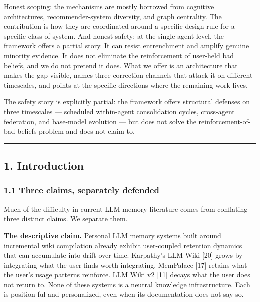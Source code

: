 \documentclass[
  11pt,
]{article}
\begin{document}
Honest scoping: the mechanisms are mostly borrowed from cognitive
architectures, recommender-system diversity, and graph centrality. The
contribution is how they are coordinated around a specific design rule
for a specific class of system. And honest safety: at the single-agent
level, the framework offers a partial story. It can resist entrenchment
and amplify genuine minority evidence. It does not eliminate the
reinforcement of user-held bad beliefs, and we do not pretend it does.
What we offer is an architecture that makes the gap visible, names three
correction channels that attack it on different timescales, and points
at the specific directions where the remaining work lives.

The safety story is explicitly partial: the framework offers structural
defenses on three timescales --- scheduled within-agent consolidation
cycles, cross-agent federation, and base-model evolution --- but does
not solve the reinforcement-of-bad-beliefs problem and does not claim
to.

\begin{center}\rule{0.5\linewidth}{0.5pt}\end{center}

\hypertarget{introduction}{%
\subsection{1. Introduction}\label{introduction}}

\hypertarget{three-claims-separately-defended}{%
\subsubsection{1.1 Three claims, separately
defended}\label{three-claims-separately-defended}}

Much of the difficulty in current LLM memory literature comes from
conflating three distinct claims. We separate them.

\textbf{The descriptive claim.} Personal LLM memory systems built around
incremental wiki compilation already exhibit user-coupled retention
dynamics that can accumulate into drift over time. Karpathy's LLM Wiki
{[}20{]} grows by integrating what the user finds worth integrating.
MemPalace {[}17{]} retains what the user's usage patterns reinforce. LLM
Wiki v2 {[}11{]} decays what the user does not return to. None of these
systems is a neutral knowledge infrastructure. Each is position-ful and
personalized, even when its documentation does not say so.
\end{document}
